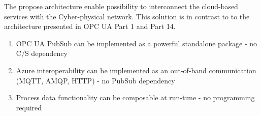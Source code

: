 \documentclass{jacsart}
\begin{document}
The propose architecture enable possibility to interconnect the cloud-based services with the Cyber-physical network. This solution is in contrast to to the architecture presented in OPC UA Part 1 and Part 14. 

\begin{enumerate}
      \item OPC UA PubSub can be implemented as a powerful standalone package - no C/S dependency
      \item Azure interoperability can be implemented as an out-of-band communication (MQTT, AMQP, HTTP) - no PubSub dependency
      \item Process data functionality can be composable at run-time - no programming required
\end{enumerate}



\end{document}
